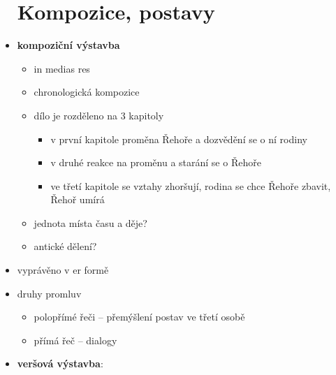 \documentclass[10pt,a4paper]{article}
\begin{document}
\begin{itemize}
\section*{Kompozice, postavy}
\item \textbf{kompoziční výstavba}
	\begin{itemize}
	\item in medias res
	\item chronologická kompozice
	\item dílo je rozděleno na 3 kapitoly
		\begin{itemize}
		\item v první kapitole proměna Řehoře a dozvědění se o ní rodiny
		\item v druhé reakce na proměnu a starání se o Řehoře
		\item ve třetí kapitole se vztahy zhoršují, rodina se chce Řehoře zbavit, Řehoř umírá
		\end{itemize}
	\item jednota místa času a děje?
	\item antické dělení?
	\end{itemize}
\item vyprávěno v er formě
\item druhy promluv
	\begin{itemize}
	\item polopřímé řeči -- přemýšlení postav ve třetí osobě
	\item přímá řeč -- dialogy
	\end{itemize}
\item \textbf{veršová výstavba}:	
\end{itemize}
\end{document}
